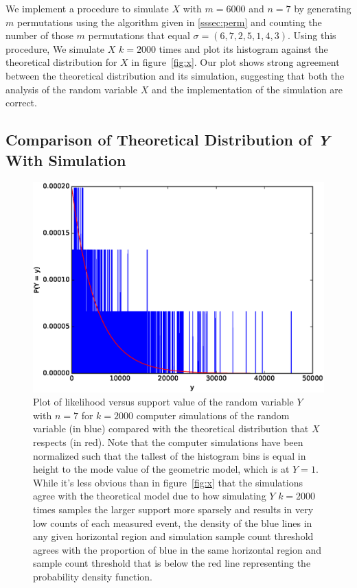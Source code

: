 \documentclass[11pt, oneside]{article}   	%
\begin{document}
We implement a procedure to simulate $X$ with $m = 6000$ and $n = 7$ by generating $m$ permutations using the algorithm given in \ref{sssec:perm} and counting the number of those $m$ permutations that equal $\sigma = (6, 7, 2, 5, 1, 4, 3)$. Using this procedure, We simulate $X$ $k = 2000$ times and plot its histogram against the theoretical distribution for $X$ in figure~\ref{fig:x}. Our plot shows strong agreement between the theoretical distribution and its simulation, suggesting that both the analysis of the random variable $X$ and the implementation of the simulation are correct.

\subsection{Comparison of Theoretical Distribution of \textit{Y} With Simulation}

\begin{figure}
\includegraphics[scale=.5]{part_1_problem_5}
\caption{Plot of likelihood versus support value of the random variable $Y$ with $n = 7$ for $k = 2000$ computer simulations of the random variable (in blue) compared with the theoretical distribution that $X$ respects (in red). Note that the computer simulations have been normalized such that the tallest of the histogram bins is equal in height to the mode value of the geometric model, which is at $Y = 1$. While it's less obvious than in figure~\ref{fig:x} that the simulations agree with the theoretical model due to how simulating $Y$ $k = 2000$ times samples the larger support more sparsely and results in very low counts of each measured event, the density of the blue lines in any given horizontal region and simulation sample count threshold agrees with the proportion of blue in the same horizontal region and sample count threshold that is below the red line representing the probability density function.}
\label{fig:y}
\end{figure}
\end{document}
